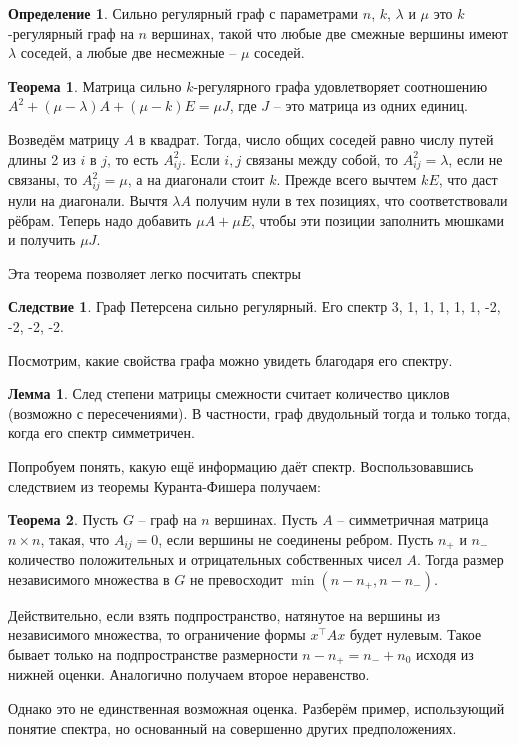\documentclass[10pt,a4paper,oneside]{book}
\theoremstyle{definition}
\newtheorem*{defn}{Определение}
\newtheorem{thm}{Теорема}
\newtheorem{lem}{Лемма}
\newtheorem{cor}{Следствие}
\def\thrm{\begin{thm}}
\def\ethrm{\end{thm}}
\def\dfn{\begin{defn}}
\def\edfn{\end{defn}}
\def\lm{\begin{lem}}
\def\elm{\end{lem}}
\def\crl{\begin{cor}}
\def\ecrl{\end{cor}}
\begin{document}
\dfn Сильно регулярный граф с параметрами $n$, $k$, $\lambda$ и $\mu$ это $k$-регулярный граф на $n$ вершинах, такой что любые две смежные вершины имеют $\lambda$ соседей, а любые две несмежные -- $\mu$ соседей.
\edfn

\thrm Матрица сильно $k$-регулярного графа удовлетворяет соотношению $A^2+(\mu-\lambda)A + (\mu-k)E=\mu J$, где $J$ -- это матрица из одних единиц.
\ethrm
\proof Возведём матрицу $A$ в квадрат. Тогда, число общих соседей равно числу путей длины 2 из $i$ в $j$, то есть $A^2_{ij}$. Если $i,j$ связаны между собой, то $A^2_{ij}=\lambda$, если не связаны, то $A^2_{ij}=\mu$, а на диагонали стоит $k$. Прежде всего вычтем $kE$, что даст нули на диагонали. Вычтя $\lambda A$ получим нули в тех позициях, что соответствовали рёбрам. Теперь надо добавить $\mu A+ \mu E$, чтобы эти позиции заполнить мюшками и получить $\mu J$. 
\endproof

Эта теорема позволяет легко посчитать спектры 
\crl
 Граф Петерсена сильно регулярный. Его спектр 3, 1, 1, 1, 1, 1, -2, -2, -2, -2.
\ecrl



Посмотрим, какие свойства графа можно увидеть благодаря его спектру.

\lm  След степени матрицы смежности считает количество циклов (возможно с пересечениями). В частности, граф двудольный тогда и только тогда, когда его спектр симметричен. 
\elm



Попробуем понять, какую ещё информацию даёт спектр. Воспользовавшись следствием из теоремы Куранта-Фишера получаем:

\thrm Пусть $G$ -- граф на $n$ вершинах. Пусть $A$ -- симметричная матрица $n\times n$, такая, что $A_{ij}= 0$, если вершины не соединены ребром. Пусть $n_{+}$ и $n_{-}$ количество положительных и отрицательных собственных чисел $A$. Тогда размер независимого множества в $G$ не превосходит $\min(n-n_{+},n-n_{-})$.
\ethrm
\proof Действительно, если взять подпространство, натянутое на вершины из независимого множества, то ограничение формы $x^{\top}Ax$ будет нулевым. Такое бывает только на подпространстве размерности $n-n_{+}=n_{-}+n_0$ исходя из нижней оценки. Аналогично получаем второе неравенство.
\endproof

Однако это не единственная возможная оценка. Разберём пример, использующий понятие спектра, но основанный на совершенно других предположениях.
\end{document}
